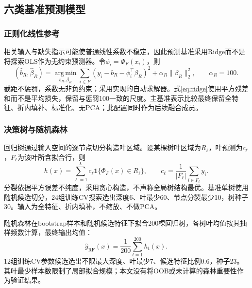 \subsection{六类基准预测模型}

\subsubsection{正则化线性参考}
相关输入与缺失指示可能使普通线性系数不稳定，因此预测基准采用Ridge而不是将探索OLS作为无约束预测器。令$\phi_i=\Phi_F(x_i)$，则
\begin{equation}
(\widehat b_R,\widehat\beta_R)=\operatorname*{arg\,min}_{b_R,\beta_R}
\sum_{i\in F}(y_i-b_R-\phi_i^\top\beta_R)^2+\alpha_R\|\beta_R\|_2^2,
\qquad\alpha_R=100.
\label{eq:ridge}
\end{equation}
截距不惩罚，系数无非负约束；采用实现的自动求解器。式\eqref{eq:ridge}使用平方残差和而不是平均损失，保留与惩罚100一致的尺度\cite{ridge}。主基准表示比较最终保留全特征、折内填补、标准化、无PCA；此配置同时作为后续融合成员。

\subsubsection{决策树与随机森林}
回归树通过输入空间的逐节点切分构造叶区域。设某棵树叶区域为$R_\ell$，叶预测为$c_\ell$，$F_\ell$为该叶所含拟合行，则
\begin{equation}
h(x)=\sum_{\ell=1}^{L}c_\ell\mathbf1\{\Phi_F(x)\in R_\ell\},
\qquad c_\ell=\frac1{|F_\ell|}\sum_{i\in F_\ell}y_i.
\label{eq:tree}
\end{equation}
分裂依据平方误差不纯度，采用贪心构造，不声称全局树结构最优。基准单树使用随机候选切分，24组训练CV搜索选出深度6、叶最少60、节点分裂最少10，树种子30。输入为全特征、折内填补，不缩放、不做PCA。

随机森林在bootstrap样本和随机候选特征下拟合200棵回归树，各树叶均值按其抽样频数计算，最终输出均值\cite{forest}：
\begin{equation}
\hat y_{\mathrm{RF}}(x)=\frac1{200}\sum_{t=1}^{200}h_t(x).
\label{eq:forest}
\end{equation}
12组训练CV参数候选选出不限最大深度、叶最少7、候选特征比例0.6，种子23。其叶最少样本数限制了局部拟合规模；本文没有将OOB或未计算的森林重要性作为验证结果。

